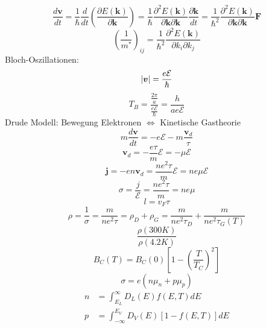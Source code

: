 \documentclass[11pt]{article}
\DeclarePairedDelimiter\abs{\lvert}{\rvert}
\begin{document}
\begin{equation}
  \frac{d\bm{v}}{dt}=\frac{1}{\hbar}\frac{d}{dt}\left(\frac{\partial E(\bm{k})}
  {\partial\bm{k}}\right)=\frac{1}{\hbar}\frac{\partial^2E(\bm{k})}
  {\partial\bm{k}\partial\bm{k}}\frac{\partial\bm{k}}{dt}=
  \frac{1}{\hbar^2}\frac{\partial^2E(\bm{k})}
  {\partial\bm{k}\partial\bm{k}}\bm{F}
\end{equation}
\begin{equation}
  \left(\frac{1}{m^*}\right)_{ij}=\frac{1}{\hbar^2}\frac{\partial^2E(\bm{k})}
  {\partial k_i\partial k_j}
\end{equation}
Bloch-Oszillationen:
\begin{equation}
  \abs{\bm{v}}=\frac{e\mathcal{E}}{\hbar}
\end{equation}
\begin{equation}
  T_B=\frac{\frac{2\pi}{a}}{\frac{e\mathcal{E}}{\hbar}}=\frac{h}{ae\mathcal{E}}
\end{equation}
Drude Modell: Bewegung Elektronen $\iff$ Kinetische Gastheorie
\begin{equation}
  m\frac{d\bm{v}}{dt}=-e\mathcal{E}-m\frac{\bm{v}_d}{\tau}
\end{equation}
\begin{equation}
  \bm{v}_d=-\frac{e\tau}{m}\bm{\mathcal{E}}=-\mu\bm{\mathcal{E}}
\end{equation}
\begin{equation}
  \bm{j}=-en\bm{v}_d=\frac{ne^2\tau}{m}\bm{\mathcal{E}}=ne\mu\bm{\mathcal{E}}
\end{equation}
\begin{equation}
  \sigma=\frac{j}{\mathcal{E}}=\frac{ne^2\tau}{m}=ne\mu
\end{equation}
\begin{equation}
  l=v_F\tau
\end{equation}
\begin{equation}
  \rho=\frac{1}{\sigma}=\frac{m}{ne^2\tau}=\rho_D+\rho_G=\frac{m}{ne^2\tau_D}+
  \frac{m}{ne^2\tau_G(T)}
\end{equation}
\begin{equation}
  \frac{\rho(300K)}{\rho(4.2K)}
\end{equation}
\begin{equation}
  B_C(T)=B_C(0)\left[1-\left(\frac{T}{T_C}\right)^2\right]
\end{equation}
\begin{equation}
  \sigma=e(n\mu_n+p\mu_p)
\end{equation}
\begin{equation}
  \begin{align}
    n&=\int_{E_L}^{\infty}D_L(E)f(E,T)dE\\
    p&=\int_{-\infty}^{E_V}D_V(E)[1-f(E,T)]dE
  \end{align}
\end{equation}
\end{document}
